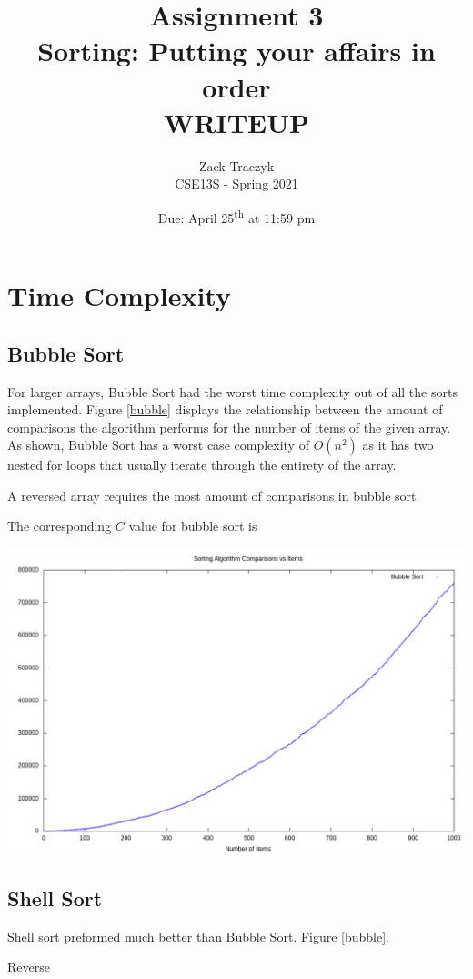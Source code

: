 \documentclass[12pt]{article}
\title{%
	\textbf{Assignment 3 \\ 
	Sorting: Putting your affairs in order \\
	\large WRITEUP} }
\author{Zack Traczyk \\ CSE13S - Spring 2021}
\date{Due: April 25\textsuperscript{th} at 11:59 pm}
\begin{document}
	\maketitle

	\section{Time Complexity}

	\subsection{Bubble Sort}

	For larger arrays, Bubble Sort had the worst time complexity out of all the sorts implemented.
	Figure \ref{bubble} displays the relationship between the amount of comparisons the algorithm performs for the number of items of the given array.
	As shown, Bubble Sort has a worst case complexity of $O(n^2)$ as it has two nested for loops that usually iterate through the entirety of the array.
	
	A reversed array requires the most amount of comparisons in bubble sort.

	The corresponding $C$ value for bubble sort is 

		\includegraphics[width=\textwidth]{bubble} \label{bubble}

	\subsection{Shell Sort}

	Shell sort preformed much better than Bubble Sort. Figure \ref{bubble}.

	Reverse
\end{document}
